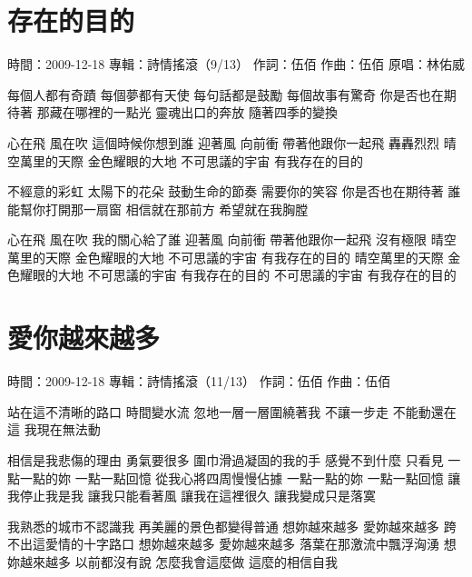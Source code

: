 \documentclass[UTF8,a4paper,oneside,twocolumn,12pt]{ctexbook}
\newcommand{\infopair}[2]{\textbullet #1：#2}
\newcommand{\zc}[1][伍佰]{\infopair{作詞}{#1}}
\newcommand{\zq}[1][伍佰]{\infopair{作曲}{#1}}
\newcommand{\zj}[1]{\infopair{專輯}{#1}}
\newcommand{\yc}[1]{\infopair{原唱}{#1}}
\newcommand{\sj}[1]{\infopair{時間}{#1}}
\newenvironment{info}{\begin{flushleft}\kaishu
	}
	{\end{flushleft}\normalsize\yahei\par}
\newenvironment{lyric}{
	}
{}
\begin{document}
\section{存在的目的}
\begin{info}
	\sj{2009-12-18}
	\zj{詩情搖滾（9/13）}
	\zc
	\zq
	\yc{林佑威}
\end{info}
\begin{lyric}
	每個人都有奇蹟 每個夢都有天使
	每句話都是鼓勵 每個故事有驚奇
	你是否也在期待著 那藏在哪裡的一點光
	靈魂出口的奔放 隨著四季的變換

	心在飛 風在吹 這個時候你想到誰
	迎著風 向前衝 帶著他跟你一起飛 轟轟烈烈
	晴空萬里的天際 金色耀眼的大地
	不可思議的宇宙 有我存在的目的

	不經意的彩虹 太陽下的花朵
	鼓動生命的節奏 需要你的笑容
	你是否也在期待著 誰能幫你打開那一扇窗
	相信就在那前方 希望就在我胸膛

	心在飛 風在吹 我的關心給了誰
	迎著風 向前衝 帶著他跟你一起飛 沒有極限
	晴空萬里的天際 金色耀眼的大地
	不可思議的宇宙 有我存在的目的
	晴空萬里的天際 金色耀眼的大地
	不可思議的宇宙 有我存在的目的
	不可思議的宇宙 有我存在的目的
\end{lyric}

\section{愛你越來越多}
\begin{info}
	\sj{2009-12-18}
	\zj{詩情搖滾（11/13）}
	\zc
	\zq
\end{info}
\begin{lyric}
	站在這不清晰的路口 時間變水流
	忽地一層一層圍繞著我 不讓一步走
	不能動還在這 我現在無法動

	相信是我悲傷的理由 勇氣要很多
	圍巾滑過凝固的我的手 感覺不到什麼
	只看見 一點一點的妳 一點一點回憶
	從我心將四周慢慢佔據
	一點一點的妳 一點一點回憶
	讓我停止我是我 讓我只能看著風
	讓我在這裡很久 讓我變成只是落寞

	我熟悉的城市不認識我
	再美麗的景色都變得普通
	想妳越來越多 愛妳越來越多
	跨不出這愛情的十字路口
	想妳越來越多 愛妳越來越多
	落葉在那激流中飄浮洶湧
	想妳越來越多 以前都沒有說
	怎麼我會這麼做 這麼的相信自我
\end{lyric}
\end{document}
